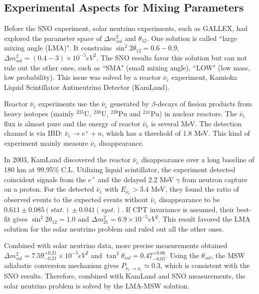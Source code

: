 \documentclass[preprint,12pt]{elsarticle}
\numberwithin{equation}{section}
\begin{document}
\subsection{Experimental Aspects for Mixing Parameters}

Before the SNO experiment, solar neutrino experiments, such as GALLEX, had explored the parameter space of $\Delta m^2_{sol}$ and $\theta_{12}$. One solution is called ``large mixing angle (LMA)". It constrains $\sin^2 2\theta_{12}=0.6-0.9$, $\Delta m^2_{sol}=(0.4-3)\times 10^{-5} eV^2$. The SNO results favor this solution but can not rule out the other ones, such as ``SMA" (small mixing angle), ``LOW" (low mass, low probability)\cite{japan_text}. This issue was solved by a reactor $\bar{\nu}_e$ experiment, Kamioka Liquid Scintillator Antineutrino Detector (KamLand).

Reactor $\bar{\nu}_e$ experiments use the $\bar{\nu}_e$ generated by $\beta$-decays of fission products from heavy isotopes (mainly $^{235}$U, $^{238}$U, $^{239}$Pu and $^{241}$Pu) in nuclear reactors. The $\bar{\nu}_e$ flux is almost pure and the energy of reactor $\bar{\nu}_e$ is several MeV. The detection channel is via IBD: $\bar{\nu}_e\to e^+ + n$, which has a threshold of 1.8 MeV. This kind of experiment mainly measure $\bar{\nu}_e$ disappearance\cite{pdg2018}.

In 2003, KamLand discovered the reactor $\bar{\nu}_e$ disappearance over a long baseline of 180 km at 99.95\% C.L. Utilizing liquid scintillator, the experiment detected coincident signals from the $e^+$ and the delayed 2.2 MeV $\gamma$ from neutron capture on a proton. For the detected $\bar{\nu}_e$ with $E_{\bar{\nu}_e}>3.4$ MeV, they found the ratio of observed events to the expected events without $\bar{\nu}_e$ disappearance to be $0.611\pm0.085(stat.)\pm0.041(syst.)$\cite{kamland}. If CPT invariance is assumed, their best-fit gives $\sin^2 2\theta_{12}=1.0$ and $\Delta m^2_{21}=6.9\times10^{-5} eV^2$. This result favored the LMA solution for the solar neutrino problem and ruled out all the other ones\cite{kamland}. 

Combined with solar neutrino data, more precise measurements obtained $\Delta m^2_{sol} = 7.59^{+0.21}_{-0.21}\times 10^{-5}eV^2$ and $\tan^2{\theta}_{sol}=0.47^{+0.06}_{-0.05}$\cite{kamland_measure}.
Using the ${\theta}_{sol}$, the MSW adiabatic conversion mechanism gives $P_{\nu_e\to\nu_e}\simeq 0.3$, which is consistent with the SNO results. Therefore, combined with KamLand and SNO measurements, the solar neutrino problem is solved by the LMA-MSW solution.
\end{document}
